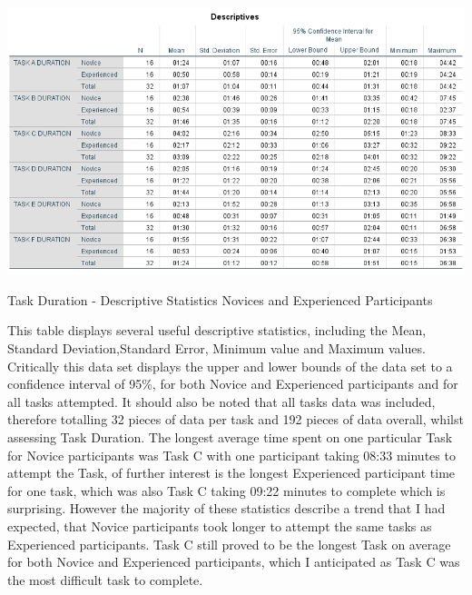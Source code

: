 \begin{table}[H]
\includegraphics[width=\linewidth]{Screenshots/UXResearchDataFiles/UXTaskDurationData/anovaDescriptivesTaskDuration.png}
\label{DurationOverallStats}
\caption{Task Duration - Descriptive Statistics Novices and Experienced Participants}
\end{table}

This table displays several useful descriptive statistics, including the Mean, Standard Deviation,Standard Error, Minimum value and Maximum values. Critically this data set displays the upper and lower bounds of the data set to a confidence interval of 95\%, for both Novice and Experienced participants and for all tasks attempted. It should also be noted that all tasks data was included, therefore totalling 32 pieces of data per task and 192 pieces of data overall, whilst assessing Task Duration. The longest average time spent on one particular Task for Novice participants was Task C with one participant taking 08:33 minutes to attempt the Task, of further interest is the longest Experienced participant time for one task, which was also Task C taking 09:22 minutes to complete which is surprising. However the majority of these statistics describe a trend that I had expected, that Novice participants took longer to attempt the same tasks as Experienced participants. Task C still proved to be the longest Task on average for both Novice and Experienced participants, which I anticipated as Task C was the most difficult task to complete.  

